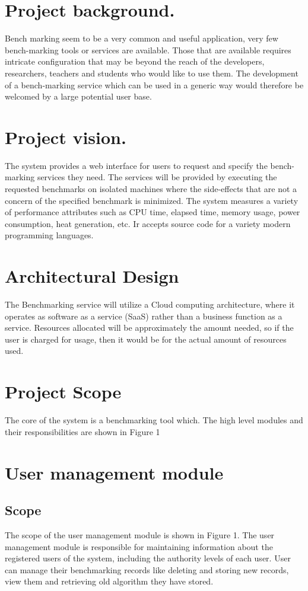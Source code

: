\documentclass[runningheads,a4paper]{article}
\begin{document}
\section{Project background.}
Bench marking seem to be a very common and useful application, very few bench-marking tools or services are available. Those that are available requires intricate configuration that may be beyond the reach of the developers, researchers,
teachers and students who would like to use them. The development of a bench-marking service which can be used in a generic way would therefore be welcomed by a large
potential user base.

\section{Project vision.}
The system provides a web interface for users to request and specify the bench-marking services they need. The services will be provided by executing the requested benchmarks on isolated machines where the side-effects that are not a concern of the specified benchmark is minimized. The system measures a variety of performance attributes such as CPU time, elapsed time, memory usage, power consumption, heat generation, etc. Ir accepts source code for a variety modern programming languages.

\section{Architectural Design}
The Benchmarking service will utilize a Cloud computing architecture, where it operates as software as a service (SaaS) rather than a business function as a service. Resources allocated will be approximately the amount needed, so if the user is charged for usage, then it would be for the actual amount of resources used.\\
\section{Project Scope}
The core of the system is a benchmarking tool which. The high level modules and their responsibilities are
shown in Figure 1

\section{User management module}
\subsection{Scope}
The scope of the user management module is shown in Figure 1. The user
management module is responsible for maintaining information about the registered
users of the system, including the authority levels of each user. User can manage their benchmarking records like deleting and storing new records, view them and retrieving old algorithm they have stored.
\end{document}
